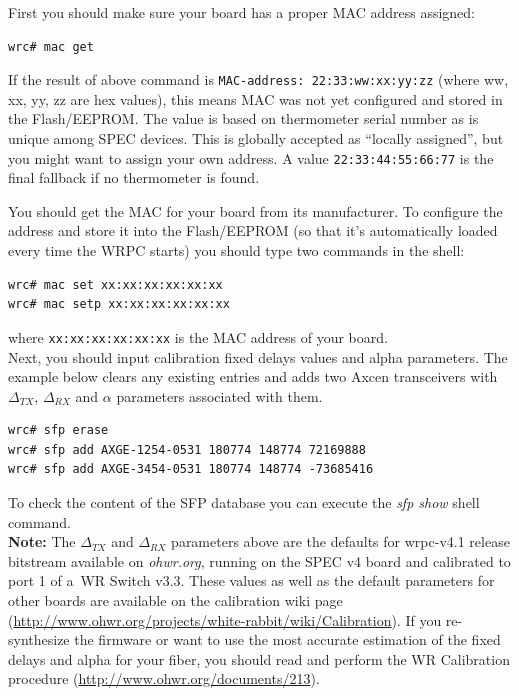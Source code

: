 \documentclass[a4paper, 12pt]{article}
\renewcommand{\_}{\underscore\allowbreak}
\begin{document}
\noindent First you should make sure your board has a proper MAC address
assigned:
\begin{lstlisting}
wrc# mac get
\end{lstlisting}
If the result of above command is \texttt{MAC-address: 22:33:ww:xx:yy:zz} (where
ww, xx, yy, zz are hex values), this
means MAC was not yet configured and stored in the Flash/EEPROM. The value is
based on thermometer serial number as is unique among SPEC devices. This is
globally accepted as ``locally assigned'', but you might want to assign your own
address. A value \texttt{22:33:44:55:66:77} is the final fallback if no
thermometer is found.

You should get the MAC for your board from its manufacturer. To configure the
address and store it into the Flash/EEPROM (so that it's automatically loaded
every time the WRPC starts) you should type two commands in the shell:
\begin{lstlisting}
wrc# mac set xx:xx:xx:xx:xx:xx
wrc# mac setp xx:xx:xx:xx:xx:xx
\end{lstlisting}
where \texttt{xx:xx:xx:xx:xx:xx} is the MAC address of your board.\\

Next, you should input calibration fixed delays values and alpha parameters. The
example below clears any existing entries and adds two Axcen transceivers with
$\Delta_{TX}$, $\Delta_{RX}$ and $\alpha$ parameters associated with them.

\begin{lstlisting}
wrc# sfp erase
wrc# sfp add AXGE-1254-0531 180774 148774 72169888
wrc# sfp add AXGE-3454-0531 180774 148774 -73685416
\end{lstlisting}

To check the content of the SFP database you can execute the \textit{sfp show}
shell command.\\

\noindent\textbf{Note:} The $\Delta_{TX}$ and $\Delta_{RX}$ parameters above are
the defaults for wrpc-v4.1 release bitstream available on \textit{ohwr.org},
running on the SPEC v4 board and calibrated to port 1 of a~WR Switch
v3.3. These values as well as the default parameters for other boards are
available on the calibration wiki page
(\url{http://www.ohwr.org/projects/white-rabbit/wiki/Calibration}). If you
re-synthesize the firmware or want to use the most accurate estimation of
the fixed delays and alpha for your fiber, you should read and perform the WR
Calibration procedure (\url{http://www.ohwr.org/documents/213}).\\
\end{document}
